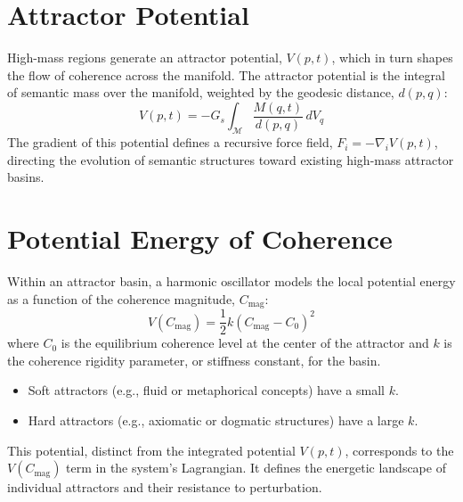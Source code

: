 \section{Attractor Potential}

High-mass regions generate an attractor potential, \(V(p,t)\), which in turn shapes the flow of coherence across the manifold. The attractor potential is the integral of semantic mass over the manifold, weighted by the geodesic distance, \(d(p,q)\):
\begin{equation}
V(p, t) = -G_s \int_{\mathcal{M}} \frac{M(q, t)}{d(p, q)} \, dV_q
\end{equation}
The gradient of this potential defines a recursive force field, \(F_i = -\nabla_i V(p,t)\), directing the evolution of semantic structures toward existing high-mass attractor basins.

\section{Potential Energy of Coherence}

Within an attractor basin, a harmonic oscillator models the local potential energy as a function of the coherence magnitude, \(C_{\text{mag}}\):
\begin{equation}
V(C_{\text{mag}}) = \frac{1}{2}k(C_{\text{mag}} - C_0)^2
\end{equation}
where \(C_0\) is the equilibrium coherence level at the center of the attractor and \(k\) is the coherence rigidity parameter, or stiffness constant, for the basin.
\begin{itemize}
    \item Soft attractors (e.g., fluid or metaphorical concepts) have a small \(k\).
    \item Hard attractors (e.g., axiomatic or dogmatic structures) have a large \(k\).
\end{itemize}
This potential, distinct from the integrated potential \(V(p,t)\), corresponds to the \(V(C_{\text{mag}})\) term in the system's Lagrangian. It defines the energetic landscape of individual attractors and their resistance to perturbation. 